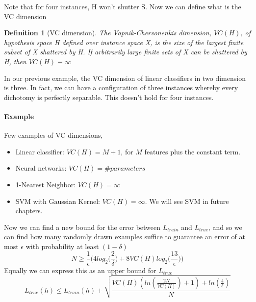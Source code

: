 \documentclass[main.tex]{subfiles}
\newtheorem{definition}{Definition}[section]
\begin{document}
Note that for four instances, H won't shutter S.\footnotemark {}
Now we can define what is the VC dimension
\begin{definition}[VC dimension]
The Vapnik-Chervonenkis dimension, $VC(H)$, of hypothesis space H
defined over instance space X, is the size of the largest finite subset of X shattered by H. If arbitrarily large finite sets of X can be shattered by H, then $VC(H) \equiv \infty$
\end{definition}
In our previous example, the VC dimension of linear classifiers in two dimension is three. In fact, we can have a configuration of three instances whereby every dichotomy is perfectly separable. This doesn't hold for four instances.
\paragraph{Example} Few examples of VC dimensions,
\begin{itemize}
    \item Linear classifier: $VC(H) = M+1$, for $M$ features plus the constant term.
    \item Neural networks: $VC(H) = \#parameters$
    \item 1-Nearest Neighbor: $VC(H) = \infty$
    \item SVM with Gaussian Kernel: $VC(H) = \infty$. We will see SVM in future chapters.
\end{itemize}
Now we can find a new bound for the error between $L_{train}$ and $L_{true}$, and so we can find how many randomly drawn examples suffice to guarantee an error of at most $\epsilon$ with probability at least $(1-\delta)$
\begin{equation}
    N \geq \frac{1}{\epsilon} \bigg( 4log_2 \bigg( \frac{2}{\delta} \bigg) + 8VC(H) log_2 \bigg( \frac{13}{\epsilon} \bigg) \bigg)
\end{equation}
Equally we can express this as an upper bound for $L_{true}$
\begin{equation}
    L_{true}(h) \leq L_{train}(h) + \sqrt{\frac{VC(H)(ln(\frac{2N}{VC(H)})+1)+ln(\frac{4}{\delta})}{N}}
\end{equation}
\end{document}
